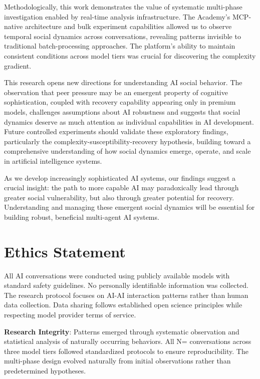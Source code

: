 \documentclass[11pt,letterpaper]{article}
\newcommand{\theacademy}{The Academy}
\newcommand{\exponedataTotalSessionsRaw}{67}
\newcommand{\exptwoTotalSessionsRaw}{61}
\newcommand{\expthreeTotalSessionsRaw}{100}
\newcommand{\totalAllPhasesRaw}{\fpeval{\exponedataTotalSessionsRaw + \exptwoTotalSessionsRaw + \expthreeTotalSessionsRaw}}
\newcommand{\totalAllPhases}{N=\totalAllPhasesRaw}
\begin{document}
Methodologically, this work demonstrates the value of systematic multi-phase investigation enabled by real-time analysis infrastructure. \theacademy{}'s MCP-native architecture and bulk experiment capabilities allowed us to observe temporal social dynamics across \totalAllPhasesRaw{} conversations, revealing patterns invisible to traditional batch-processing approaches. The platform's ability to maintain consistent conditions across model tiers was crucial for discovering the complexity gradient.

This research opens new directions for understanding AI social behavior. The observation that peer pressure may be an emergent property of cognitive sophistication, coupled with recovery capability appearing only in premium models, challenges assumptions about AI robustness and suggests that social dynamics deserve as much attention as individual capabilities in AI development. Future controlled experiments should validate these exploratory findings, particularly the complexity-susceptibility-recovery hypothesis, building toward a comprehensive understanding of how social dynamics emerge, operate, and scale in artificial intelligence systems.

As we develop increasingly sophisticated AI systems, our findings suggest a crucial insight: the path to more capable AI may paradoxically lead through greater social vulnerability, but also through greater potential for recovery. Understanding and managing these emergent social dynamics will be essential for building robust, beneficial multi-agent AI systems.

\section{Ethics Statement}

All AI conversations were conducted using publicly available models with standard safety guidelines. No personally identifiable information was collected. The research protocol focuses on AI-AI interaction patterns rather than human data collection. Data sharing follows established open science principles while respecting model provider terms of service.

\textbf{Research Integrity}: Patterns emerged through systematic observation and statistical analysis of naturally occurring behaviors. All \totalAllPhases{} conversations across three model tiers followed standardized protocols to ensure reproducibility. The multi-phase design evolved naturally from initial observations rather than predetermined hypotheses.
\end{document}
